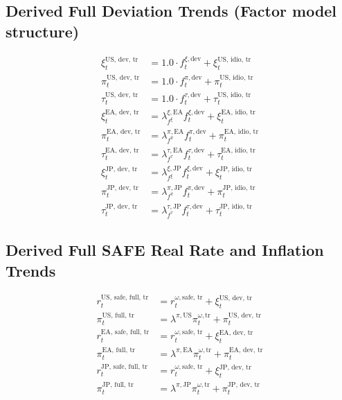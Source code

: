 \documentclass{article}
\begin{document}
\subsection*{Derived Full Deviation Trends (Factor model structure)}
\begin{align}
    \xi^{\text{US, dev, tr}}_t &= 1.0 \cdot f^{\xi, \text{dev}}_t + \xi^{\text{US, idio, tr}}_t \\
    \pi^{\text{US, dev, tr}}_t &= 1.0 \cdot f^{\pi, \text{dev}}_t + \pi^{\text{US, idio, tr}}_t \\
    \tau^{\text{US, dev, tr}}_t &= 1.0 \cdot f^{\tau, \text{dev}}_t + \tau^{\text{US, idio, tr}}_t \\
    \xi^{\text{EA, dev, tr}}_t &= \lambda^{\xi, \text{EA}}_{f^{\xi}} f^{\xi, \text{dev}}_t + \xi^{\text{EA, idio, tr}}_t \\
    \pi^{\text{EA, dev, tr}}_t &= \lambda^{\pi, \text{EA}}_{f^{\pi}} f^{\pi, \text{dev}}_t + \pi^{\text{EA, idio, tr}}_t \\
    \tau^{\text{EA, dev, tr}}_t &= \lambda^{\tau, \text{EA}}_{f^{\tau}} f^{\tau, \text{dev}}_t + \tau^{\text{EA, idio, tr}}_t \\
    \xi^{\text{JP, dev, tr}}_t &= \lambda^{\xi, \text{JP}}_{f^{\xi}} f^{\xi, \text{dev}}_t + \xi^{\text{JP, idio, tr}}_t \\
    \pi^{\text{JP, dev, tr}}_t &= \lambda^{\pi, \text{JP}}_{f^{\pi}} f^{\pi, \text{dev}}_t + \pi^{\text{JP, idio, tr}}_t \\
    \tau^{\text{JP, dev, tr}}_t &= \lambda^{\tau, \text{JP}}_{f^{\tau}} f^{\tau, \text{dev}}_t + \tau^{\text{JP, idio, tr}}_t
\end{align}

\subsection*{Derived Full SAFE Real Rate and Inflation Trends}
\begin{align}
    r^{\text{US, safe, full, tr}}_t &= r^{\omega, \text{safe, tr}}_t + \xi^{\text{US, dev, tr}}_t \\ %
    \pi^{\text{US, full, tr}}_t &= \lambda^{\pi, \text{US}} \pi^{\omega, \text{tr}}_t + \pi^{\text{US, dev, tr}}_t \\
    r^{\text{EA, safe, full, tr}}_t &= r^{\omega, \text{safe, tr}}_t + \xi^{\text{EA, dev, tr}}_t \\ %
    \pi^{\text{EA, full, tr}}_t &= \lambda^{\pi, \text{EA}} \pi^{\omega, \text{tr}}_t + \pi^{\text{EA, dev, tr}}_t \\
    r^{\text{JP, safe, full, tr}}_t &= r^{\omega, \text{safe, tr}}_t + \xi^{\text{JP, dev, tr}}_t \\ %
    \pi^{\text{JP, full, tr}}_t &= \lambda^{\pi, \text{JP}} \pi^{\omega, \text{tr}}_t + \pi^{\text{JP, dev, tr}}_t
\end{align}
\end{document}
